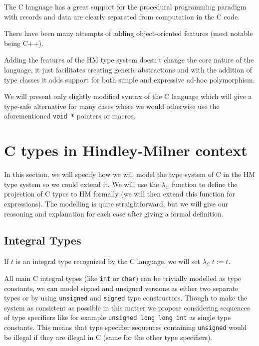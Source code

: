 The C language has a great support for the procedural programming paradigm with records and data are clearly separated from computation in the C code.

There have been many attempts of adding object-oriented features (most notable being C++).

Adding the features of the HM type system doesn't change the core nature of the language, it just facilitates creating generic abstractions and with the addition of type classes it adds support for both simple and expressive ad-hoc polymorphism.

We will present only slightly modified syntax of the C language which will give a type-safe alternative for many cases where we would otherwise use the aforementioned \lstinline{void *} pointers or macros.

\iffalse
\section{C99 types}


All C types
\fi

\section{C types in Hindley-Milner context}

In this section, we will specify how we will model the type system of C in the HM type system so we could extend it. We will use the $\lambda_C$ function to define the projection of C types to HM formally (we will then extend this function for expressions). The modelling is quite straightforward, but we will give our reasoning and explanation for each case after giving a formal definition.

\subsection{Integral Types}

\begin{defn}
	If $t$ is an integral type recognized by the C language, we will set $\lambda_C\ t := t$.
\end{defn}

All main C integral types (like \lstinline{int} or \lstinline{char}) can be trivially modelled as type constants, we can model signed and unsigned versions as either two separate types or by using \lstinline{unsigned} and \lstinline{signed} type constructors. Though to make the system as consistent as possible in this matter we propose considering sequences of type specifiers like for example \lstinline{unsigned long long int} as single type constants. This means that type specifier sequences containing \lstinline{unsigned} would be illegal if they are illegal in C (same for the other type specifiers).

